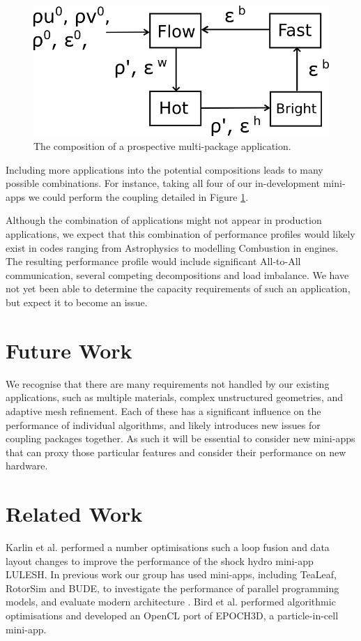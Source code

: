\documentclass[runningheads,a4paper]{llncs}
\begin{document}
\begin{figure}
  \centering
  \includegraphics[width=0.6\linewidth]{all-four-flow}
  \caption{The composition of a prospective multi-package application.}
  \label{fig:multi-package-flow}
\end{figure}

Including more applications into the potential compositions leads to many possible combinations. For instance, taking all four of our in-development mini-apps we could perform the coupling detailed in Figure \ref{fig:multi-package-flow}.

Although the combination of applications might not appear in production applications, we expect that this combination of performance profiles would likely exist in codes ranging from Astrophysics to modelling Combustion in engines. The resulting performance profile would include significant All-to-All communication, several competing decompositions and load imbalance. We have not yet been able to determine the capacity requirements of such an application, but expect it to become an issue.

\section{Future Work}

We recognise that there are many requirements not handled by our existing applications, such as multiple materials, complex unstructured geometries, and adaptive mesh refinement. Each of these has a significant influence on the performance of individual algorithms, and likely introduces new issues for coupling packages together. As such it will be essential to consider new mini-apps that can proxy those particular features and consider their performance on new hardware.

\section{Related Work}

Karlin et al. \cite{Karlin2012} performed a number optimisations such a loop fusion and data layout changes to improve the performance of the shock hydro mini-app LULESH. In previous work our group has used mini-apps, including TeaLeaf, RotorSim and BUDE, to investigate the performance of parallel programming models, and evaluate modern architecture \cite{McIntosh2014} \cite{Martineau2016}. Bird et al. \cite{Bird2013} performed algorithmic optimisations and developed an OpenCL port of EPOCH3D, a particle-in-cell mini-app. 
\end{document}
